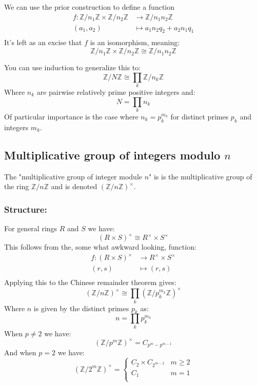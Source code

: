 We can use the prior construction to define a function 
\begin{equation*}
\begin{aligned}
f:\mathbb{Z}/n_1\mathbb{Z}\times\mathbb{Z}/n_2\mathbb{Z} &\rightarrow \mathbb{Z}/n_1n_2\mathbb{Z}\\
(a_1,a_2)&\mapsto a_1n_2q_2+a_2n_1q_1\\
\end{aligned}
\end{equation*}
It's left as an excise that $f$ is an isomorphism, meaning:
\[\mathbb{Z}/n_1\mathbb{Z}\times\mathbb{Z}/n_2\mathbb{Z} \cong \mathbb{Z}/n_1n_2\mathbb{Z}\]

You can use induction to generalize this to:
\[\mathbb{Z}/N\mathbb{Z} \cong \prod_k\mathbb{Z}/n_k\mathbb{Z}\]
Where $n_k$ are pairwise relatively prime positive integers and:
\[N =\prod_k n_k \]
Of particular importance is the case where $n_k = p_k^{m_k}$ for distinct primes $p_k$ and integers $m_k$.

\subsection{Multiplicative group of integers modulo $n$}
The "multiplicative group of integer module $n$" is is the multiplicative group of the ring $\mathbb{Z}/n\mathbb{Z}$ and is denoted $(\mathbb{Z}/n\mathbb{Z})^\times$.

\subsubsection{Structure:}
For general rings $R$ and $S$ we have:
\[(R\times S)^\times \cong R^\times \times S^\times\]
This follows from the, some what awkward looking, function:
\begin{equation*}
\begin{aligned}
	f:(R\times S)^\times&\rightarrow R^\times \times S^\times\\
	(r,s)&\mapsto (r,s)\\
\end{aligned}
\end{equation*}
Applying this to the Chinese remainder theorem gives:
\[(\mathbb{Z}/n\mathbb{Z})^\times \cong \prod_k (\mathbb{Z}/p_k^{m_k}\mathbb{Z})^\times\]
Where $n$ is given by the distinct primes $p_k$ as:
\[n =\prod_k p_k^{m_k} \]
When $p\neq 2$ we have: 
\[(\mathbb{Z}/p^{m}\mathbb{Z})^\times = C_{p^{m}-p^{m-1}}\]
And when $p=2$ we have:
\[(\mathbb{Z}/2^{m}\mathbb{Z})^\times =\begin{cases} 
	C_2\times C_{2^{m-2}} & m\geq 2\\
	C_1 & m = 1\\
\end{cases}\]


